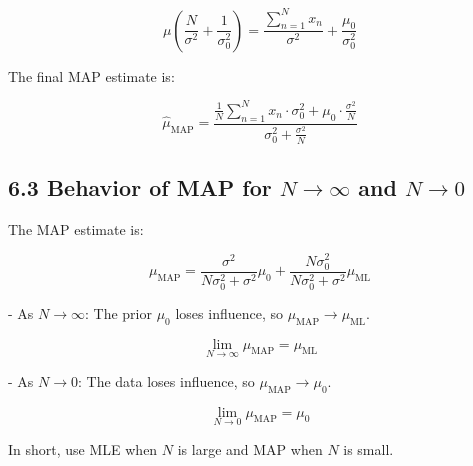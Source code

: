 \documentclass{article}
\begin{document}
\[
\mu \left( \frac{N}{\sigma^2} + \frac{1}{\sigma_0^2} \right) = \frac{\sum_{n=1}^N x_n}{\sigma^2} + \frac{\mu_0}{\sigma_0^2}
\]

The final MAP estimate is:

\[
\hat{\mu}_{\text{MAP}} = \frac{\frac{1}{N} \sum_{n=1}^N x_n \cdot \sigma_0^2 + \mu_0 \cdot \frac{\sigma^2}{N}}{\sigma_0^2 + \frac{\sigma^2}{N}}
\]

\subsection*{6.3 Behavior of MAP for $N \to \infty$ and $N \to 0$}

The MAP estimate is:

\[
\mu_{\text{MAP}} = \frac{\sigma^2}{N\sigma_0^2 + \sigma^2} \mu_0 + \frac{N\sigma_0^2}{N\sigma_0^2 + \sigma^2} \mu_{\text{ML}}
\]

- As $N \to \infty$: The prior $\mu_0$ loses influence, so $\mu_{\text{MAP}} \to \mu_{\text{ML}}$.

\[
\lim_{N \to \infty} \mu_{\text{MAP}} = \mu_{\text{ML}}
\]

- As $N \to 0$: The data loses influence, so $\mu_{\text{MAP}} \to \mu_0$.

\[
\lim_{N \to 0} \mu_{\text{MAP}} = \mu_0
\]

In short, use MLE when $N$ is large and MAP when $N$ is small.
\end{document}
